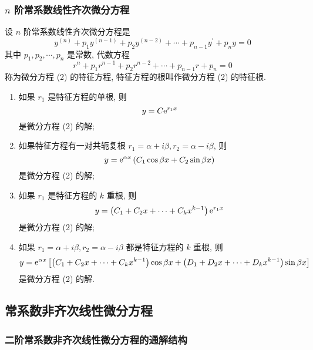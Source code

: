 \subsubsection{$n$ 阶常系数线性齐次微分方程}

\begin{theorem}[$n$ 阶常系数线性齐次微分方程通解结构]
    设 $ n $ 阶常系数线性齐次微分方程是
    \begin{equation*}
        y^{(n)}+p_{1} y^{(n-1)}+p_{2} y^{(n-2)}+\cdots+p_{n-1} y^{\prime}+p_{n} y=0
        \tag{2}
    \end{equation*}
    其中 $ p_{1}, p_{2}, \cdots, p_{n} $ 是常数, 代数方程
    $$r^{n}+p_{1} r^{n-1}+p_{2} r^{n-2}+\cdots+p_{n-1} r+p_{n}=0$$
    称为微分方程 (2) 的特征方程, 特征方程的根叫作微分方程 (2) 的特征根.
    \begin{enumerate}[label=(\arabic{*})]
        \item 如果 $ r_{1} $ 是特征方程的单根, 则
              $$y=C \mathrm{e}^{r_{1} x}$$
              是微分方程 (2) 的解;
        \item 如果特征方程有一对共轭复根 $ r_{1}=\alpha+i \beta, r_{2}=\alpha-i \beta$, 则
              $$y=\mathrm{e}^{\alpha x}\left(C_{1} \cos \beta x+C_{2} \sin \beta x\right)$$
              是微分方程 (2) 的解;
        \item 如果 $ r_{1} $ 是特征方程的 $ k $ 重根, 则
              $$y=\left(C_{1}+C_{2} x+\cdots+C_{k} x^{k-1}\right) \mathrm{e}^{r_{1} x}$$
              是微分方程 (2) 的解;
        \item 如果 $ r_{1}=\alpha+i \beta, r_{2}=\alpha-i \beta $ 都是特征方程的 $ k $ 重根, 则
              $$y=\mathrm{e}^{\alpha x}\left[\left(C_{1}+C_{2} x+\cdots+C_{k} x^{k-1}\right) \cos \beta x+\left(D_{1}+D_{2} x+\cdots+D_{k} x^{k-1}\right) \sin \beta x\right]$$
              是微分方程 (2) 的解.
    \end{enumerate}
\end{theorem}

\subsection{常系数非齐次线性微分方程}

\subsubsection{二阶常系数非齐次线性微分方程的通解结构}


